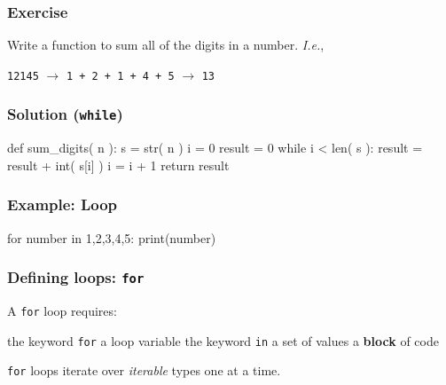 \documentclass[11pt]{beamer}
\begin{document}
\begin{frame}[fragile]
  \frametitle{Exercise}
  \Enlarge

  Write a function to sum all of the digits in a number.  \emph{I.e.},

  \begin{center}
  \texttt{12145} $\rightarrow$ \texttt{1 + 2 + 1 + 4 + 5} $\rightarrow$ \texttt{13}
  \end{center}
\end{frame}

\begin{frame}[fragile]
  \frametitle{Solution (\texttt{while})}
  \Enlarge

  \begin{semiverbatim}
def sum_digits( n ):
    s = str( n )
    i = 0
    result = 0
    while i < len( s ):
        result = result + int( s[i] )
        i = i + 1
    return result
  \end{semiverbatim}
\end{frame}

\begin{frame}[fragile]
  \frametitle{Example:  Loop}
  \Enlarge

  \begin{semiverbatim}
for number in 1,2,3,4,5:
    print(number)
  \end{semiverbatim}
\end{frame}

\begin{frame}[fragile]
  \frametitle{Defining loops:  \texttt{for}}
  \Enlarge

  \begin{itemize}
  \myitem  A \texttt{for} loop requires:
    \begin{itemize}
    \mysubitem  the keyword \texttt{for}
    \mysubitem  a loop variable
    \mysubitem  the keyword \texttt{in}
    \mysubitem  a set of values
    \mysubitem  a \textbf{block} of code
    \end{itemize}
  \myitem  \texttt{for} loops iterate over \emph{iterable} types one at a time.
  \end{itemize}
\end{frame}
\end{document}
